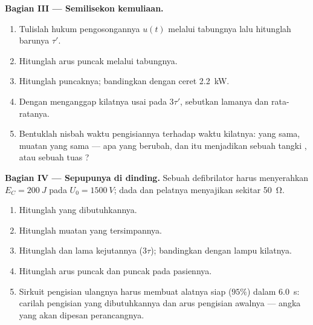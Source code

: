 \begin{problem}
\medskip
\noindent\textbf{Bagian III --- Semilisekon kemuliaan.}
\begin{enumerate}[resume]
  \item Tulislah hukum pengosongannya $u(t)$ melalui tabungnya lalu hitunglah
         barunya $\tau'$.
  \item Hitunglah arus puncak melalui tabungnya.
  \item Hitunglah  puncaknya; bandingkan dengan ceret \qty{2.2}{kW}.
  \item Dengan menganggap kilatnya usai pada $3\tau'$, sebutkan lamanya dan
         rata-ratanya.
  \item Bentuklah nisbah waktu pengisiannya terhadap waktu kilatnya:  yang sama,
        muatan yang sama --- apa yang berubah, dan itu menjadikan 
        sebuah tangki , atau sebuah tuas ?
\end{enumerate}

\medskip
\noindent\textbf{Bagian IV --- Sepupunya di dinding.}
Sebuah defibrilator harus menyerahkan $E_C = \qty{200}{J}$ pada
$U_0 = \qty{1500}{V}$; dada dan pelatnya menyajikan sekitar \qty{50}{\ohm}.
\begin{enumerate}[resume]
  \item Hitunglah  yang dibutuhkannya.
  \item Hitunglah muatan yang tersimpannya.
  \item Hitunglah  dan lama kejutannya ($3\tau$);
        bandingkan dengan lampu kilatnya.
  \item Hitunglah arus puncak dan  puncak pada pasiennya.
  \item Sirkuit pengisian ulangnya harus membuat alatnya siap ($95\%$) dalam
        \qty{6.0}{s}: carilah  pengisian yang dibutuhkannya dan
        arus pengisian awalnya --- angka yang akan dipesan perancangnya.
\end{enumerate}
\end{problem}

